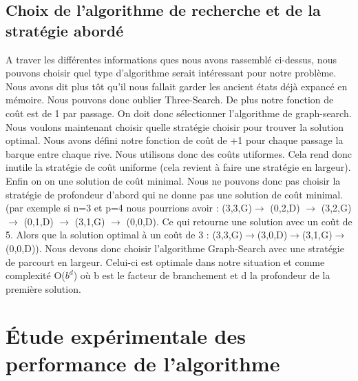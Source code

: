 \documentclass[a4paper, 12pt, french,oneside]{book}
\begin{document}
\section{Choix de l'algorithme de recherche et de la stratégie abordé}
A traver les différentes informations ques nous avons rassemblé ci-dessus, nous pouvons choisir quel type d'algorithme serait intéressant pour notre problème. Nous avons dit plus tôt qu'il nous fallait garder les ancient états déjà expancé en mémoire. Nous pouvons donc oublier Three-Search. De plus notre fonction de coût est de 1 par passage. On doit donc sélectionner l'algorithme de graph-search. Nous voulons maintenant choisir quelle stratégie choisir pour trouver la solution optimal. Nous avons défini notre fonction de coût de +1 pour chaque passage la barque entre chaque rive. Nous utilisons donc des coûts utiformes. Cela rend donc inutile la stratégie de coût uniforme (cela revient à faire une stratégie en largeur). Enfin on on une solution de coût minimal. Nous ne pouvons donc pas choisir la stratégie de profondeur d'abord qui ne donne pas une solution de coût minimal. (par exemple si n=3 et p=4 nous pourrions avoir : (3,3,G)$\rightarrow$ (0,2,D) $\rightarrow$ (3,2,G) $\rightarrow$ (0,1,D) $\rightarrow$ (3,1,G) $\rightarrow$ (0,0,D). Ce qui retourne une solution avec un coût de 5. Alors que la solution optimal à un coût de 3 : (3,3,G)$\rightarrow$(3,0,D)$\rightarrow$(3,1,G)$\rightarrow$(0,0,D)). Nous devons donc choisir l'algorithme Graph-Search avec une stratégie de parcourt en largeur. Celui-ci est optimale dans notre situation et comme complexité O($b^d$) où b est le facteur de branchement et d la profondeur de la première solution.

\chapter{Étude expérimentale des performance de l'algorithme}
\end{document}
